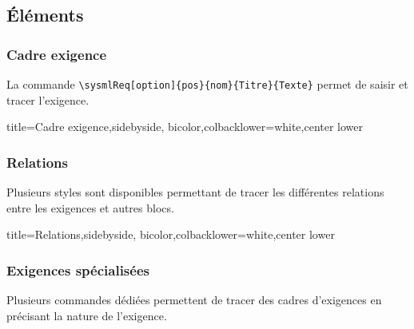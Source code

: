 \documentclass[a4paper,11pt]{article}                      %
\begin{document}
\subsection{Éléments}
\subsubsection{Cadre exigence}


La commande \verb!\sysmlReq[option]{pos}{nom}{Titre}{Texte}!  permet de saisir et tracer l'exigence.

\begin{tcblisting}{title={Cadre exigence},sidebyside, bicolor,colbacklower=white,center lower}
\end{tcblisting}

\subsubsection{Relations}

Plusieurs styles  sont disponibles permettant de tracer les différentes  relations entre les exigences et autres blocs.

\begin{tcblisting}{title={Relations},sidebyside, bicolor,colbacklower=white,center lower}
\end{tcblisting}

\subsubsection{Exigences spécialisées}

Plusieurs commandes dédiées permettent de tracer des cadres d'exigences en précisant la nature de l'exigence.
\end{document}
